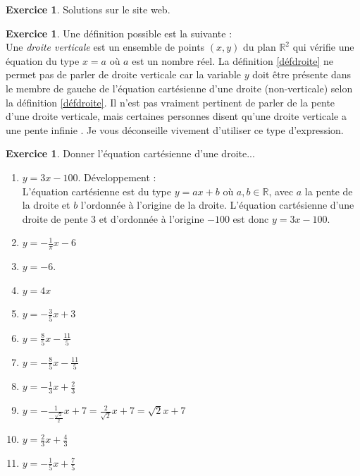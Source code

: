 \documentclass[a4paper,13pt]{scrreprt}
\theoremstyle{plain}
\theoremstyle{definition}
\newtheorem{exo}[subsection]{Exercice}
\newcommand{\rr}{\mathbb{R}}
\begin{document}
\begin{exo}
	Solutions sur le site web.
\end{exo}

\begin{exo}
	Une définition possible est la suivante : \\
	Une \emph{droite verticale} est un ensemble de points $(x,y)$ du plan ${\rr}^2$ qui vérifie une équation du type $x = a$ où $a$ est un nombre réel.
	La définition \ref{défdroite} ne permet pas de parler de droite verticale car la variable $y$ doit être présente dans le membre de gauche de l'équation cartésienne d'une droite (non-verticale) selon la définition \ref{défdroite}. Il n'est pas vraiment pertinent de parler de la pente d'une droite verticale, mais certaines personnes disent qu'une droite verticale a \og une pente infinie \fg{}. Je vous déconseille vivement d'utiliser ce type d'expression.
\end{exo}

\begin{exo}
	Donner l'équation cartésienne d'une droite...
	\begin{enumerate}
		\item $y=3x-100$. Développement : \\
		L'équation cartésienne est du type $y=ax+b$ où $a,b \in \rr$, avec $a$ la pente de la droite et $b$ l'ordonnée à l'origine de la droite. L'équation cartésienne d'une droite de pente $3$ et d'ordonnée à l'origine $-100$ est donc $y=3x-100$.
		\begin{center}
		\end{center}
		\item $y=-\frac{1}{\pi}x-6$
		\item $y=-6$.
		\item $y=4x$
		\item $y= -\frac{3}{5}x+3$
		\item $y=\frac{8}{5}x - \frac{11}{5}$
		\item $y=-\frac{8}{5}x - \frac{11}{5}$
		\item $y=-\frac{1}{3}x+\frac{2}{3}$
		\item $y=-\frac{1}{-\frac{\sqrt{2}}{2}}x + 7=\frac{2}{\sqrt{2}}x + 7 = \sqrt{2}x + 7$
		\item $y=\frac{2}{3}x+\frac{4}{3}$
		\item $y=-\frac{1}{5}x+\frac{7}{5}$
	\end{enumerate}
\end{exo}
\end{document}
